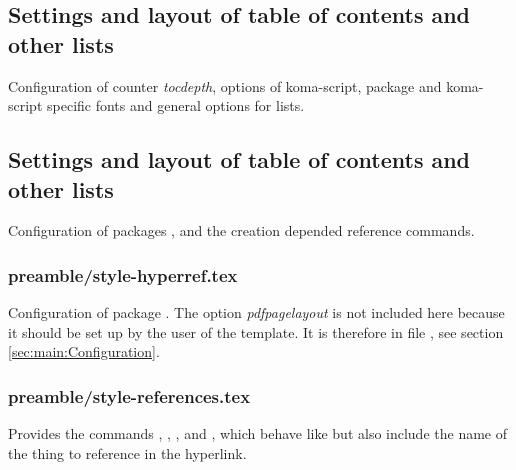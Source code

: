 
\subsection{Settings and layout of table of contents and other lists}

Configuration of counter \emph{tocdepth}, options of koma-script, package  and koma-script specific fonts and general options for lists.


\subsection{Settings and layout of table of contents and other lists}

Configuration of packages ,  and the creation  depended reference commands.


\subsubsection{preamble/style-hyperref.tex}

Configuration of package . The option \emph{pdfpagelayout} is not included here because it should be set up by the user of the template. It is therefore in file , see section \vref{sec:main:Configuration}.


\subsubsection{preamble/style-references.tex}

Provides the commands , , ,  and , which behave like  but also include the name of the thing to reference in the hyperlink.

